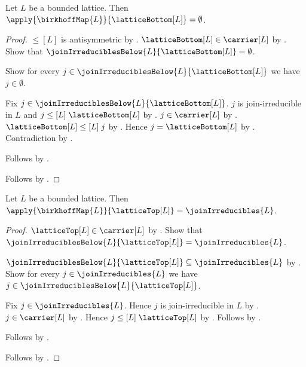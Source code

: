 \begin{proposition}\label{birkhoff_map_lattice_bottom}
    Let $L$ be a bounded lattice.
    Then $\apply{\birkhoffMap{L}}{\latticeBottom[L]}=\emptyset$.
\end{proposition}
\begin{proof}
    $\leq[L]$ is antisymmetric by
        .
    $\latticeBottom[L]\in\carrier[L]$ by
        .
    Show that $\joinIrreduciblesBelow{L}{\latticeBottom[L]}
        =\emptyset$.
    \begin{subproof}
        Show for every
            $j\in\joinIrreduciblesBelow{L}{\latticeBottom[L]}$
            we have $j\in\emptyset$.
        \begin{subproof}
            Fix $j\in\joinIrreduciblesBelow{L}{\latticeBottom[L]}$.
            $j$ is join-irreducible in $L$ and
                $j\mathrel{\leq[L]}\latticeBottom[L]$ by
                .
            $j\in\carrier[L]$ by .
            $\latticeBottom[L]\mathrel{\leq[L]}j$ by
                .
            Hence $j=\latticeBottom[L]$ by .
            Contradiction by .
        \end{subproof}
        Follows by .
    \end{subproof}
    Follows by .
\end{proof}

\begin{proposition}\label{birkhoff_map_lattice_top}
    Let $L$ be a bounded lattice.
    Then $\apply{\birkhoffMap{L}}{\latticeTop[L]}=\joinIrreducibles{L}$.
\end{proposition}
\begin{proof}
    $\latticeTop[L]\in\carrier[L]$ by .
    Show that $\joinIrreduciblesBelow{L}{\latticeTop[L]}
        =\joinIrreducibles{L}$.
    \begin{subproof}
        $\joinIrreduciblesBelow{L}{\latticeTop[L]}
            \subseteq\joinIrreducibles{L}$ by
            .
        Show for every $j\in\joinIrreducibles{L}$ we have
            $j\in\joinIrreduciblesBelow{L}{\latticeTop[L]}$.
        \begin{subproof}
            Fix $j\in\joinIrreducibles{L}$.
            Hence $j$ is join-irreducible in $L$ by
                .
            $j\in\carrier[L]$ by .
            Hence $j\mathrel{\leq[L]}\latticeTop[L]$ by
                .
            Follows by .
        \end{subproof}
        Follows by .
    \end{subproof}
    Follows by .
\end{proof}

